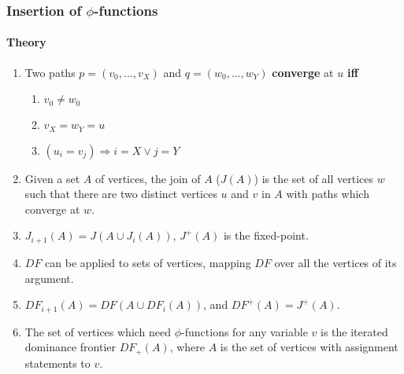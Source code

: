\documentclass[a4paper,12pt, notitlepage]{article}
\renewcommand{\iff}{\textbf{ iff }}
\begin{document}
\subsubsection*{Insertion of $\phi$-functions}
\paragraph*{Theory}
\begin{enumerate}
\item Two paths $p = (v_0, ..., v_X)$ and $q = (w_0, ..., w_Y)$
\textbf{converge} at $u$ \iff
    \begin{enumerate}
        \item $v_0 \not= w_0$
        \item $v_X = w_Y = u$
        \item $(u_i = v_j) \Rightarrow i = X \lor j = Y$
    \end{enumerate}
\item Given a set $A$ of vertices, the join of $A$ ($J(A)$) is the set of all
vertices $w$ such that there are two distinct vertices $u$ and $v$ in $A$ with
paths which converge at $w$.
\item $J_{i+1}(A) = J(A \cup J_{i}(A))$, $J^+(A)$ is the fixed-point.
\item $DF$ can be applied to sets of vertices, mapping $DF$ over all the
vertices of its argument.
\item $DF_{i+1}(A) = DF(A \cup DF_{i}(A))$, and $DF^+(A) = J^+(A)$.
\item The set of vertices which need $\phi$-functions for any variable $v$
is the iterated dominance frontier $DF_+(A)$, where $A$ is the set of vertices
with assignment statements to $v$.

\end{enumerate}
\end{document}
